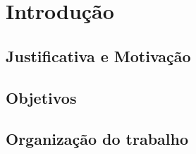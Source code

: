 \chapter{Introdução}
\label{cap-introducao}

\section{Justificativa e Motivação}

\section{Objetivos}

\section{Organização do trabalho}

